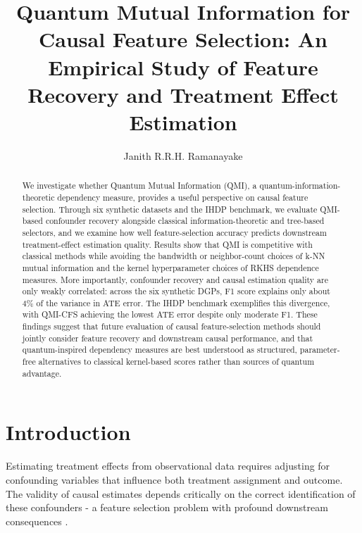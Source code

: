 \documentclass{svproc}
\begin{document}
\mainmatter

\title{Quantum Mutual Information for Causal Feature Selection: An Empirical Study of Feature Recovery and Treatment Effect Estimation}
%
%
\author{Janith R.R.H. Ramanayake}
%
%
%

\maketitle

\begin{abstract}
We investigate whether Quantum Mutual Information (QMI), a quantum-information-theoretic dependency measure, provides a useful perspective on causal feature selection. Through six synthetic datasets and the IHDP benchmark, we evaluate QMI-based confounder recovery alongside classical information-theoretic and tree-based selectors, and we examine how well feature-selection accuracy predicts downstream treatment-effect estimation quality. Results show that QMI is competitive with classical methods while avoiding the bandwidth or neighbor-count choices of k-NN mutual information and the kernel hyperparameter choices of RKHS dependence measures. More importantly, confounder recovery and causal estimation quality are only weakly correlated: across the six synthetic DGPs, F1 score explains only about 4\% of the variance in ATE error. The IHDP benchmark exemplifies this divergence, with QMI-CFS achieving the lowest ATE error despite only moderate F1. These findings suggest that future evaluation of causal feature-selection methods should jointly consider feature recovery and downstream causal performance, and that quantum-inspired dependency measures are best understood as structured, parameter-free alternatives to classical kernel-based scores rather than sources of quantum advantage.
\end{abstract}

\section{Introduction}
\label{sec:intro}

Estimating treatment effects from observational data requires adjusting for confounding variables that influence both treatment assignment and outcome. The validity of causal estimates depends critically on the correct identification of these confounders - a feature selection problem with profound downstream consequences \cite{pearl2009causality,imbens2015causal}.
\end{document}
